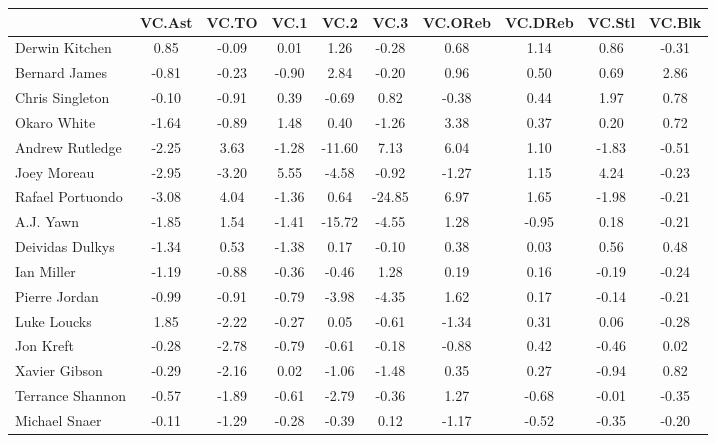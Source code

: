 \documentclass[10pt,letterpaper]{article}
\begin{document}
\begin{table}[ht]
\begin{center}
\begin{tabular}{lccccccccc}
  \hline
 & VC.Ast & VC.TO & VC.1 & VC.2 & VC.3 & VC.OReb & VC.DReb & VC.Stl & VC.Blk \\ 
  \hline
Derwin Kitchen & 0.85 & -0.09 & 0.01 & 1.26 & -0.28 & 0.68 & 1.14 & 0.86 & -0.31 \\ 
  Bernard James & -0.81 & -0.23 & -0.90 & 2.84 & -0.20 & 0.96 & 0.50 & 0.69 & 2.86 \\ 
  Chris Singleton & -0.10 & -0.91 & 0.39 & -0.69 & 0.82 & -0.38 & 0.44 & 1.97 & 0.78 \\ 
  Okaro White & -1.64 & -0.89 & 1.48 & 0.40 & -1.26 & 3.38 & 0.37 & 0.20 & 0.72 \\ 
  Andrew Rutledge & -2.25 & 3.63 & -1.28 & -11.60 & 7.13 & 6.04 & 1.10 & -1.83 & -0.51 \\ 
  Joey Moreau & -2.95 & -3.20 & 5.55 & -4.58 & -0.92 & -1.27 & 1.15 & 4.24 & -0.23 \\ 
  Rafael Portuondo & -3.08 & 4.04 & -1.36 & 0.64 & -24.85 & 6.97 & 1.65 & -1.98 & -0.21 \\ 
  A.J. Yawn & -1.85 & 1.54 & -1.41 & -15.72 & -4.55 & 1.28 & -0.95 & 0.18 & -0.21 \\ 
  Deividas Dulkys & -1.34 & 0.53 & -1.38 & 0.17 & -0.10 & 0.38 & 0.03 & 0.56 & 0.48 \\ 
  Ian Miller & -1.19 & -0.88 & -0.36 & -0.46 & 1.28 & 0.19 & 0.16 & -0.19 & -0.24 \\ 
  Pierre Jordan & -0.99 & -0.91 & -0.79 & -3.98 & -4.35 & 1.62 & 0.17 & -0.14 & -0.21 \\ 
  Luke Loucks & 1.85 & -2.22 & -0.27 & 0.05 & -0.61 & -1.34 & 0.31 & 0.06 & -0.28 \\ 
  Jon Kreft & -0.28 & -2.78 & -0.79 & -0.61 & -0.18 & -0.88 & 0.42 & -0.46 & 0.02 \\ 
  Xavier Gibson & -0.29 & -2.16 & 0.02 & -1.06 & -1.48 & 0.35 & 0.27 & -0.94 & 0.82 \\ 
  Terrance Shannon & -0.57 & -1.89 & -0.61 & -2.79 & -0.36 & 1.27 & -0.68 & -0.01 & -0.35 \\ 
  Michael Snaer & -0.11 & -1.29 & -0.28 & -0.39 & 0.12 & -1.17 & -0.52 & -0.35 & -0.20 \\ 
   \hline
\end{tabular}
\end{center}
\end{table}
\end{document}
